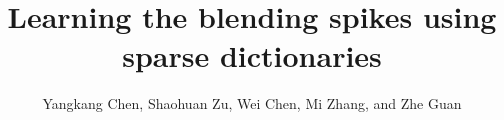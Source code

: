 

\title{Learning the blending spikes using sparse dictionaries}
\renewcommand{\thefootnote}{\fnsymbol{footnote}}

\author{Yangkang Chen\footnotemark[1], Shaohuan Zu\footnotemark[1], Wei Chen\footnotemark[2]\footnotemark[3], Mi Zhang\footnotemark[4],  and Zhe Guan\footnotemark[5]}

\address{
\footnotemark[1]
School of Earth Sciences\\
Zhejiang University\\
Hangzhou, Zhejiang Province, China, 310027\\
yangkang.chen@zju.edu.cn \\
\footnotemark[2]Key Laboratory of Exploration Technology for Oil \\
and Gas Resources of Ministry of Education\\
Yangtze University\\
Daxue Road No.111\\
Caidian District, Wuhan, China, 430100\\
\footnotemark[3]Hubei Cooperative Innovation Center of Unconventional Oil and Gas\\
Daxue Road No.111\\
Caidian District, Wuhan, China, 430100\\
chenwei\_yangtze@126.com \\
\footnotemark[4]State Key Laboratory of Petroleum Resources and Prospecting \\
China University of Petroleum \\
Fuxue Road 18th\\
Beijing, China, 102200 \\
cupmi@sina.com \\
\footnotemark[5]
Applied Physics Program\\
Rice University\\
Houston, TX, USA\\
Zhe.Guan@rice.edu\\
}


